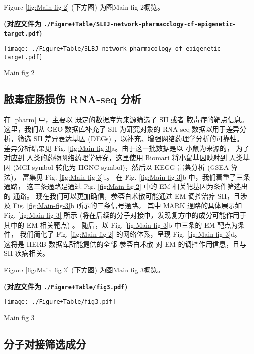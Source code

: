 \documentclass[
]{article}
\begin{document}
Figure \ref{fig:Main-fig-2} (下方图) 为图Main fig 2概览。

\textbf{(对应文件为 \texttt{./Figure+Table/SLBJ-network-pharmacology-of-epigenetic-target.pdf})}

\def\@captype{figure}
\begin{center}
\texttt{[image: ./Figure+Table/SLBJ-network-pharmacology-of-epigenetic-target.pdf]}
\caption{Main fig 2}\label{fig:Main-fig-2}
\end{center}

\hypertarget{rna}{%
\subsection{脓毒症肠损伤 RNA-seq 分析}\label{rna}}

在 \ref{pharm} 中，主要以 既定的数据库为来源筛选了 SII 或者 脓毒症的靶点信息。
这里，我们从 GEO 数据库补充了 SII 为研究对象的 RNA-seq 数据以用于差异分析，筛选
SII 差异表达基因 (DEGs) ，以补充、增强网络药理学分析的可靠性。
差异分析结果见 Fig. \ref{fig:Main-fig-3}a。由于这一批数据是以 小鼠为来源的，
为了对应到 人类的药物网络药理学研究，这里使用 Biomart 将小鼠基因映射到
人类基因 (MGI symbol 转化为 HGNC symbol)，然后以 KEGG 富集分析 (GSEA 算法)，
富集见 Fig. \ref{fig:Main-fig-3}b。
在 Fig. \ref{fig:Main-fig-3}b 中，我们着重了三条通路，
这三条通路是通过 Fig. \ref{fig:Main-fig-2} 中的 EM 相关靶基因为条件筛选出的
通路。
现在我们可以更加确信，参苓白术散可能通过 EM 调控治疗 SII，且涉及 Fig. \ref{fig:Main-fig-3}b
所示的三条信号通路。
其中 MARK 通路的具体展示如 Fig. \ref{fig:Main-fig-3} 所示
(将在后续的分子对接中，发现复方中的成分可能作用于其中的 EM 相关靶点) 。
随后，以 Fig. \ref{fig:Main-fig-3}b 中三条的 EM 靶点为条件，
我们简化了 Fig. \ref{fig:Main-fig-2} 的网络体系，呈现 Fig. \ref{fig:Main-fig-3}d。
这将是 HERB 数据库所能提供的全部 参苓白术散 对 EM 的调控作用信息，且与 SII 疾病相关。

Figure \ref{fig:Main-fig-3} (下方图) 为图Main fig 3概览。

\textbf{(对应文件为 \texttt{./Figure+Table/fig3.pdf})}

\def\@captype{figure}
\begin{center}
\texttt{[image: ./Figure+Table/fig3.pdf]}
\caption{Main fig 3}\label{fig:Main-fig-3}
\end{center}

\hypertarget{ux5206ux5b50ux5bf9ux63a5ux7b5bux9009ux6210ux5206}{%
\subsection{分子对接筛选成分}\label{ux5206ux5b50ux5bf9ux63a5ux7b5bux9009ux6210ux5206}}
\end{document}
